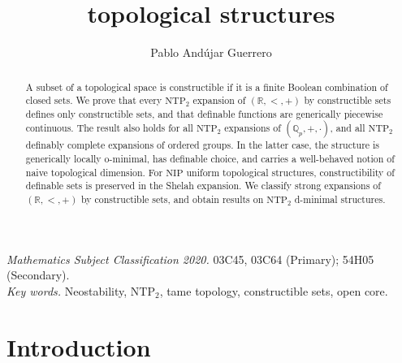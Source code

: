 \documentclass[12pt]{article}
\title{\NTP{} topological structures}
\author{Pablo And\'ujar Guerrero}
\date{}
\newcommand{\R}{\mathbb{R}}
\newcommand{\Q}{\mathbb{Q}}
\newcommand{\NIP}{\ensuremath{\mathrm{NIP}}}
\newcommand{\NTP}{\ensuremath{\mathrm{NTP}_2}}
\theoremstyle{definition}
\theoremstyle{remark}
\begin{document}
\maketitle 

\begin{abstract}
A subset of a topological space is constructible if it is a finite Boolean combination of closed sets. We prove that every $\NTP$ expansion of $(\R,<,+)$ by constructible sets defines only constructible sets, and that definable functions are generically piecewise continuous. The result also holds for all $\NTP$ expansions of $(\Q_p,+,\cdot)$, and all $\NTP$ definably complete expansions of ordered groups. In the latter case, the structure is generically locally o-minimal, has definable choice, and carries a well-behaved notion of naive topological dimension. For $\NIP$ uniform topological structures, constructibility of definable sets is preserved in the Shelah expansion. We classify strong expansions of $(\R,<,+)$ by constructible sets, and obtain results on $\NTP$ d-minimal structures. 
\end{abstract}


\noindent
{\small \emph{Mathematics Subject Classification 2020.} 03C45, 03C64 (Primary); 54H05 (Secondary). \\
\emph{Key words.} Neostability, $\NTP$, tame topology, constructible sets, open core.} 

\section{Introduction}

\end{document}
